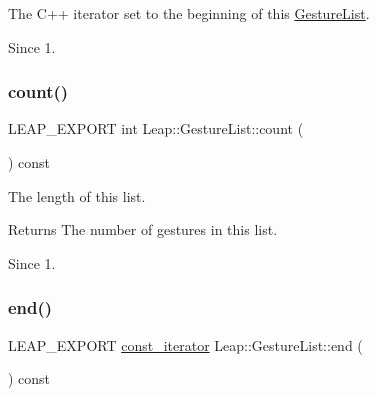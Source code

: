 The C++ iterator set to the beginning of this \hyperlink{class_leap_1_1_gesture_list}{Gesture\+List}.


\begin{DoxyCodeInclude}
\end{DoxyCodeInclude}


\begin{DoxySince}{Since}
1. 
\end{DoxySince}
\mbox{\label{class_leap_1_1_gesture_list_af8d4ba7be0100e36809c0817d72aa380}} 
\subsubsection{\texorpdfstring{count()}{count()}}
{\footnotesize\ttfamily L\+E\+A\+P\+\_\+\+E\+X\+P\+O\+RT int Leap\+::\+Gesture\+List\+::count (\begin{DoxyParamCaption}{ }\end{DoxyParamCaption}) const}

The length of this list.


\begin{DoxyCodeInclude}
\end{DoxyCodeInclude}


\begin{DoxyReturn}{Returns}
The number of gestures in this list. 
\end{DoxyReturn}
\begin{DoxySince}{Since}
1. 
\end{DoxySince}
\mbox{\label{class_leap_1_1_gesture_list_adbf76512046899a413dfea4b3a63b836}} 
\subsubsection{\texorpdfstring{end()}{end()}}
{\footnotesize\ttfamily L\+E\+A\+P\+\_\+\+E\+X\+P\+O\+RT \hyperlink{class_leap_1_1_gesture_list_aaf2fd030e686892a0da42d81fc0cad88}{const\+\_\+iterator} Leap\+::\+Gesture\+List\+::end (\begin{DoxyParamCaption}{ }\end{DoxyParamCaption}) const}

